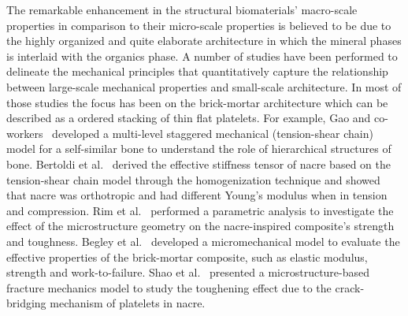\documentclass[preprint,12pt,times,draft]{elsarticle}
\numberwithin{equation}{section}
\renewcommand{\>}{$\Rightarrow$}
\begin{document}
The remarkable enhancement in the structural biomaterials' macro-scale properties in comparison to their micro-scale properties is believed to be due to the highly organized and quite elaborate architecture in which the mineral phases is interlaid with the organics phase.
A number of studies have been performed to delineate the mechanical principles that quantitatively capture the relationship between large-scale mechanical properties and small-scale architecture.
%
In most of those studies the focus has been on the brick-mortar architecture which can be described as a ordered stacking of thin flat platelets.
%
For example, Gao and co-workers~\cite{gao2006application, ji2010mechanical} developed a multi-level staggered mechanical (tension-shear chain) model for a self-similar bone to understand the role of hierarchical structures of bone.
%
Bertoldi et al.~\cite{bertoldi2008nacre} derived the effective stiffness tensor of nacre based on the tension-shear chain model through the homogenization technique and showed that nacre was orthotropic and had different Young's modulus when in tension and compression.
%
Rim et al.~\cite{rim2011dimensional} performed a parametric analysis to investigate the effect of the microstructure geometry on the nacre-inspired composite's strength and toughness.
%
Begley et al.~\cite{begley2012micromechanical} developed a micromechanical model to evaluate the effective properties of the brick-mortar composite, such as elastic modulus, strength and work-to-failure.
%
Shao et al.~\cite{shao2012discontinuous} presented a microstructure-based fracture mechanics model to study the toughening effect due to the crack-bridging mechanism of platelets in nacre.
%
\end{document}
